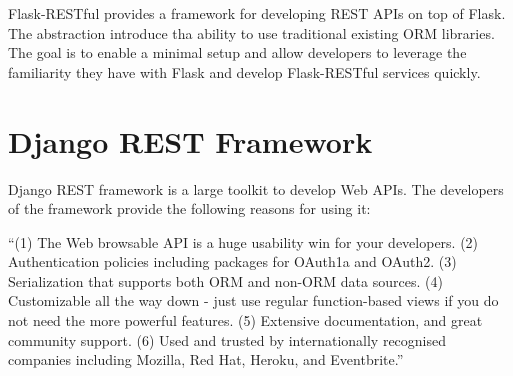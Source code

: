 Flask-RESTful provides a framework for developing REST APIs on top of
Flask. The abstraction introduce tha ability to use traditional existing
ORM libraries. The goal is to enable a minimal setup and allow
developers to leverage the familiarity they have with Flask and
develop Flask-RESTful services quickly.


\section{Django REST Framework}


Django REST framework is a large toolkit to develop Web APIs. The
developers of the framework provide the following reasons for using it:

``(1) The Web browsable API is a huge usability win for your
developers.  (2) Authentication policies including packages for
OAuth1a and OAuth2.  (3) Serialization that supports both ORM and
non-ORM data sources.  (4) Customizable all the way down - just use
regular function-based views if you do not need the more powerful
features.  (5) Extensive documentation, and great community support.
(6) Used and trusted by internationally recognised companies including
Mozilla, Red Hat, Heroku, and Eventbrite.''


